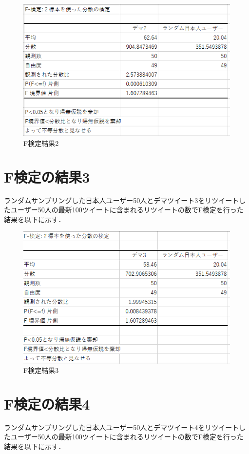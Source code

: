 \begin{figure}[htb]
\centering
\includegraphics[width=13cm]{15.png}
\caption{F検定結果2}\label{28}
\end{figure}
\clearpage

\section{F検定の結果3}
ランダムサンプリングした日本人ユーザー50人とデマツイート3をリツイートしたユーザー50人の最新100ツイートに含まれるリツイートの数でF検定を行った結果を以下に示す．

\begin{figure}[htb]
\centering
\includegraphics[width=13cm]{16.png}
\caption{F検定結果3}\label{28}
\end{figure}
\clearpage

\section{F検定の結果4}
ランダムサンプリングした日本人ユーザー50人とデマツイート4をリツイートしたユーザー50人の最新100ツイートに含まれるリツイートの数でF検定を行った結果を以下に示す．

